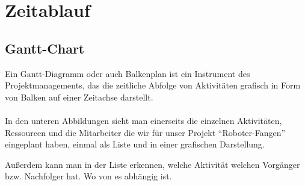 \section{Zeitablauf}
\subsection{Gantt-Chart}
Ein Gantt-Diagramm oder auch Balkenplan ist ein Instrument des Projektmanagements, das die zeitliche Abfolge von Aktivitäten grafisch in Form von Balken auf einer Zeitachse darstellt.
\\\\
In den unteren Abbildungen sieht man einerseits die einzelnen Aktivitäten, Ressourcen und die Mitarbeiter die wir für unser Projekt "`Roboter-Fangen"' eingeplant haben, einmal als Liste und in einer grafischen Darstellung.

Außerdem kann man in der Liste erkennen, welche Aktivität welchen Vorgänger bzw. Nachfolger hat. Wo von es abhängig ist. 

